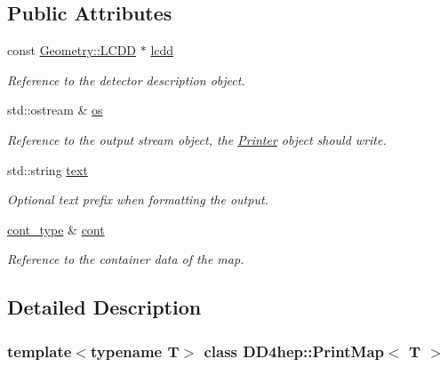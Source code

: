 \subsection*{Public Attributes}
\begin{DoxyCompactItemize}
\item 
const \hyperlink{class_d_d4hep_1_1_geometry_1_1_l_c_d_d}{Geometry::LCDD} $\ast$ \hyperlink{struct_d_d4hep_1_1_print_map_a7d3f9991b68729e077b0682903d5448d}{lcdd}
\begin{DoxyCompactList}\small\item\em Reference to the detector description object. \item\end{DoxyCompactList}\item 
std::ostream \& \hyperlink{struct_d_d4hep_1_1_print_map_af89e40c312ce2cf93e6956d3d03b704b}{os}
\begin{DoxyCompactList}\small\item\em Reference to the output stream object, the \hyperlink{struct_d_d4hep_1_1_printer}{Printer} object should write. \item\end{DoxyCompactList}\item 
std::string \hyperlink{struct_d_d4hep_1_1_print_map_ad776e7ab0023498d02708495e5dd0b1c}{text}
\begin{DoxyCompactList}\small\item\em Optional text prefix when formatting the output. \item\end{DoxyCompactList}\item 
\hyperlink{struct_d_d4hep_1_1_print_map_a75356a94ee86763170e76a2096ec4cb5}{cont\_\-type} \& \hyperlink{struct_d_d4hep_1_1_print_map_a5129907f452fc99969ce127ee6bb0f31}{cont}
\begin{DoxyCompactList}\small\item\em Reference to the container data of the map. \item\end{DoxyCompactList}\end{DoxyCompactItemize}


\subsection{Detailed Description}
\subsubsection*{template$<$typename T$>$ class DD4hep::PrintMap$<$ T $>$}

